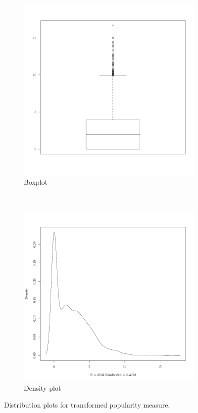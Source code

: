 \begin{figure}
    \centering
    \begin{subfigure}[b]{0.4\textwidth}
        \includegraphics[width=\textwidth]{figures/popuTransformedBox}
        \caption{Boxplot}
        \label{fig:popuTransformedBox}
    \end{subfigure}
    ~
    \begin{subfigure}[b]{0.4\textwidth}
        \includegraphics[width=\textwidth]{figures/popuTransformedDensity}
        \caption{Density plot}
        \label{fig:popuTransformedDensity}
    \end{subfigure}
    \caption{Distribution plots for transformed popularity measure.}
\end{figure}


